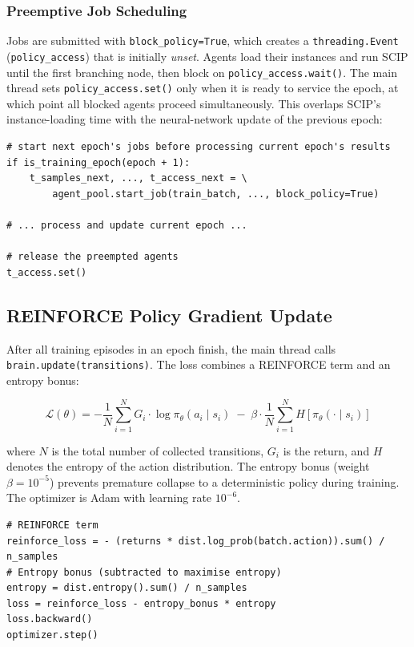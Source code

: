 \subsubsection{Preemptive Job Scheduling}

Jobs are submitted with \texttt{block\_policy=True}, which creates a \texttt{threading.Event} (\texttt{policy\_access}) that is initially \emph{unset}. Agents load their instances and run SCIP until the first branching node, then block on \texttt{policy\_access.wait()}. The main thread sets \texttt{policy\_access.set()} only when it is ready to service the epoch, at which point all blocked agents proceed simultaneously. This overlaps SCIP's instance-loading time with the neural-network update of the previous epoch:

\begin{lstlisting}
# start next epoch's jobs before processing current epoch's results
if is_training_epoch(epoch + 1):
    t_samples_next, ..., t_access_next = \
        agent_pool.start_job(train_batch, ..., block_policy=True)

# ... process and update current epoch ...

# release the preempted agents
t_access.set()
\end{lstlisting}

\subsection{REINFORCE Policy Gradient Update}

After all training episodes in an epoch finish, the main thread calls \texttt{brain.update(transitions)}. The loss combines a REINFORCE term and an entropy bonus:

\[
    \mathcal{L}(\theta) = -\frac{1}{N} \sum_{i=1}^{N} G_i \cdot \log \pi_\theta(a_i \mid s_i)
                          \;-\; \beta \cdot \frac{1}{N}\sum_{i=1}^{N} H[\pi_\theta(\cdot \mid s_i)]
\]

where $N$ is the total number of collected transitions, $G_i$ is the return, and $H$ denotes the entropy of the action distribution. The entropy bonus (weight $\beta = 10^{-5}$) prevents premature collapse to a deterministic policy during training. The optimizer is Adam with learning rate $10^{-6}$.

\begin{lstlisting}
# REINFORCE term
reinforce_loss = - (returns * dist.log_prob(batch.action)).sum() / n_samples
# Entropy bonus (subtracted to maximise entropy)
entropy = dist.entropy().sum() / n_samples
loss = reinforce_loss - entropy_bonus * entropy
loss.backward()
optimizer.step()
\end{lstlisting}


